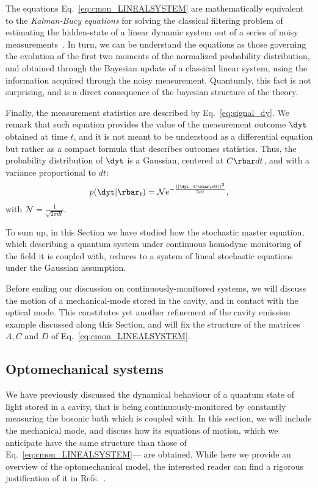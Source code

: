 The equations Eq.~\ref{eq:cmon_LINEALSYSTEM} are mathematically equivalent to the \textit{Kalman-Bucy equations} for solving the classical filtering problem of estimating the hidden-state of a linear dynamic system out of a series of noisy measurements~\cite{doherty1999feedback}. In turn, we can be understand the equations as those governing the evolution of the first two moments of the normalized probability distribution, and obtained through the Bayesian update of a classical linear system, using the information acquired through the noisy measurement. Quantumly, this fact is not surprising, and is a direct consequence of the bayesian structure of the theory.

Finally, the measurement statistics are described by Eq.~\ref{eq:signal_dy}. We remark that such equation provides the value of the measurement outcome $\dyt$ obtained at time $t$, and it is not meant to be understood as a differential equation but rather as a compact formula that describes outcomes statistics. Thus, the probability distribution of $\dyt$ is a Gaussian, centered at $C\rbar dt$, and with a variance proportional to $dt$:
\begin{align}
p(\dyt|\rbar_t) = \mathcal{N} e^{-\frac{||\dyt - C\rbar_t dt||^2}{2 dt}},
\end{align}
with $\mathcal{N} = \frac{1}{\sqrt{2 \pi dt}}$.

To sum up, in this Section we have studied how the stochastic master equation, which describing a quantum system under continuous homodyne monitoring of the field it is coupled with, reduces to a system of lineal stochastic equations under the Gaussian assumption.

Before ending our discussion on continuously-monitored systems, we will discuss the motion of a mechanical-mode stored in the cavity, and in contact with the optical mode. This constitutes yet another refinement of the cavity emission example discussed along this Section, and will fix the structure of the matrices $A,C$ and $D$ of Eq.~\ref{eq:cmon_LINEALSYSTEM}.

\subsection{Optomechanical systems}\label{ssec:1_cmon_model}
We have previously discussed the dynamical behaviour of a quantum state of light stored in a cavity, that is being continuously-monitored by constantly measuring the bosonic bath which is coupled with. In this section, we will include the mechanical mode, and discuss how its equations of motion, which we anticipate have the same structure than those of Eq.~\ref{eq:cmon_LINEALSYSTEM}--- are obtained. While here we provide an overview of the optomechanical model, the interested reader can find a rigorous justification of it in Refs.~\cite{doherty1999feedback,wiseman1993quantum}.

